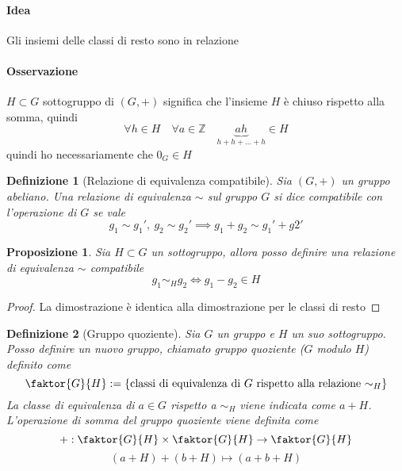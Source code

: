 \documentclass[a4paper]{report}
\newtheorem{proposition}{Proposizione}
\newtheorem{definition}{Definizione}
\newcommand{\Z}{\ensuremath{\mathbb{Z}}}
\begin{document}
\paragraph{Idea} Gli insiemi delle classi di resto sono in relazione
\paragraph{Osservazione} $H\subset G$ sottogruppo di $(G,+)$ significa che l'insieme $H$ è chiuso rispetto alla somma, quindi
\[
    \forall h\in H\quad\forall a\in\Z\quad \underbrace{ah}_{h+h+\dots+h}\in H
\]
quindi ho necessariamente che $0_G\in H$
\begin{definition}[Relazione di equivalenza compatibile]
    Sia $(G,+)$ un gruppo abeliano. Una relazione di equivalenza $\sim$ sul gruppo $G$ si dice compatibile con l'operazione di $G$ se vale
    \[
        g_1\sim g_1',\ g_2\sim g_2'\implies g_1+g_2\sim g_1'+g2'
    \]
\end{definition}
\begin{proposition}
    Sia $H\subset G$ un sottogruppo, allora posso definire una relazione di equivalenza $\sim$ compatibile
    \[
        g_1\sim_H g_2 \Longleftrightarrow g_1-g_2\in H
    \]
\end{proposition}
\begin{proof}
    La dimostrazione è identica alla dimostrazione per le classi di resto
\end{proof}
\begin{definition}[Gruppo quoziente]
    Sia $G$ un gruppo e $H$ un suo sottogruppo. Posso definire un nuovo gruppo, chiamato gruppo quoziente ($G$ modulo $H$) definito come
    \[
        \faktor{G}{H}:=\{\text{classi di equivalenza di $G$ rispetto alla relazione $\sim_H$}\}
    \]
    La classe di equivalenza di $a\in G$ rispetto a $\sim_H$ viene indicata come $a+H$.\\
    L'operazione di somma del gruppo quoziente viene definita come
    \[
        +:\faktor{G}{H}\times\faktor{G}{H}\rightarrow\faktor{G}{H}
    \]
    \[
        (a+H)+(b+H)\mapsto (a+b+H)
    \]
\end{definition}
\end{document}
